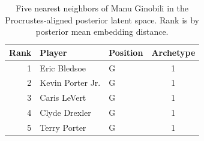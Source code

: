 \begin{table}[htbp]
  \centering\small
  \begin{tabular}{rllc}
    \toprule
    Rank & Player & Position & Archetype \\
    \midrule
    1 & Eric Bledsoe & G & 1 \\
    2 & Kevin Porter Jr. & G & 1 \\
    3 & Caris LeVert & G & 1 \\
    4 & Clyde Drexler & G & 1 \\
    5 & Terry Porter & G & 1 \\
    \bottomrule
  \end{tabular}
  \caption{Five nearest neighbors of Manu Ginobili in the Procrustes-aligned posterior latent space. Rank is by posterior mean embedding distance.}
  \label{tab:Manu_Ginobili_neighbors}
\end{table}

